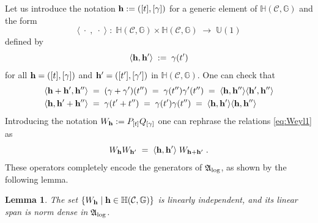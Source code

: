 \documentclass[a4paper,12pt,twoside,reqno]{amsart}
\theoremstyle{plain}
\newtheorem{lemma}[teo]{Lemma}
\theoremstyle{definition}
\theoremstyle{remark}
\numberwithin{equation}{section}
\numberwithin{figure}{section}
\numberwithin{table}{section}
\newcommand{\f}[1]{\mathcal{#1}}
\newcommand{\n}[1]{\mathbb{#1}}
\begin{document}
	
	Let us introduce the notation ${\bf h}:=([t],[\gamma])$ for a generic element of 
	$\n{H}(\f{C},\n{G})$ and
	the form
	\[
	\langle\;\cdot\;,\;\cdot\;\rangle\;:\;\n{H}(\f{C},\n{G})\times \n{H}(\f{C},\n{G})\;\longrightarrow\;\n{U}(1)
	\]
	defined by 
	\[
	\langle {\bf h} ,{\bf h}'\rangle\;:=\;\gamma(t')
	\]
	for all ${\bf h}=([t],[\gamma])$ and ${\bf h}'=([t'],[\gamma'])$ in 
	$\n{H}(\f{C},\n{G})$. One can check that 
	\[
	\begin{aligned}
		\langle {\bf h} +{\bf h}',{\bf h}''\rangle\;&=\;(\gamma+\gamma')(t'')\;=\;\gamma(t'')\gamma'(t'')\;=\;\langle {\bf h} ,{\bf h}''\rangle\langle{\bf h}',{\bf h}''\rangle\\
		\langle {\bf h} ,{\bf h}'+{\bf h}''\rangle\;&=\;\gamma(t'+t'')\;=\;\gamma(t')\gamma(t'')\;=\;\langle {\bf h} ,{\bf h}'\rangle\langle{\bf h},{\bf h}''\rangle
	\end{aligned}
	\]
	Introducing the notation $W_{{\bf h}}:=P_{[t]}Q_{[\gamma]}$ one can rephrase the relations \eqref{eq:Weyl1} as
	\begin{equation}\label{eq:Weyl2}
		W_{{\bf h}}W_{{\bf h}'}\;=\;\langle {\bf h} ,{\bf h}'\rangle\;W_{{\bf h}+{\bf h}'}\;.
	\end{equation}
	These operators completely encode the generators of $\mathfrak{A}_{\rm log}$, as shown by the following lemma.
	
	
	
	\begin{lemma}\label{lem:linear_independence_logical}
		The set
		$\left\{W_{\bf h}\;\middle|\;{\bf h}\in\n{H}(\f{C},\n{G})\right\}
		$
		is linearly independent, and its linear span is norm dense in $\mathfrak{A}_{\rm log}$.
	\end{lemma}
	
\end{document}
